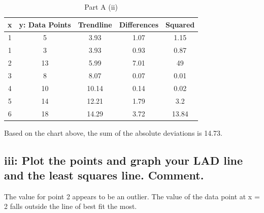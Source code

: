 \begin{table}[ht]
\caption{Part A (ii)}
\centering
\begin{tabular}{c | c | c | c | c}
\hline\hline
x & y: Data Points & Trendline & Differences & Squared \\ [0.5ex] %
\hline
1 & 5 & 3.93 & 1.07 & 1.15 \\
1 & 3 & 3.93 & 0.93 & 0.87 \\
2 & 13 & 5.99 & 7.01 & 49\\
3 & 8 & 8.07 & 0.07 & 0.01 \\
4 & 10 & 10.14 & 0.14 & 0.02 \\
5 & 14 & 12.21 & 1.79 & 3.2 \\
6 & 18 & 14.29 & 3.72 & 13.84 \\ [1ex]
\hline
\end{tabular}
\label{table:nonlin}
\end{table}

Based on the chart above, the sum of the absolute deviations is 14.73.

\subsection{iii: Plot the points and graph your LAD line and the least squares line. Comment.}
The value for point 2 appears to be an outlier. The value of the data point at x = 2 falls outside the line of best fit the most. 

